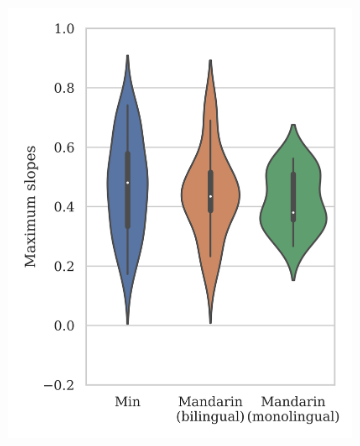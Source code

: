 \documentclass[12pt]{report}
\begin{document}
\begin{CJK}{UTF8}{bsmi}
\begin{figure}[hbt!]
\centering
\begin{subfigure}[b]{.49\textwidth}
\centering
\includegraphics[width=\textwidth]{Figures/E3/Result_51.png}
\end{subfigure}
\hfill
\begin{subfigure}[b]{.49\textwidth}
\centering

\end{subfigure}
\end{figure}
\end{CJK}
\end{document}
